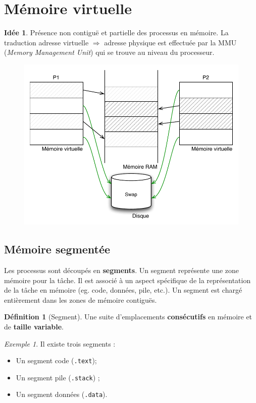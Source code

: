 \documentclass[11pt,english,french]{scrreprt}
\theoremstyle{remark}
\newtheorem*{ex*}{Exemple}
\theoremstyle{definition}
\newtheorem*{def*}{Définition}
\newtheorem*{idee*}{Idée}
\begin{document}
\section{Mémoire virtuelle}
\begin{idee*}
	Présence non contiguë et partielle des processus en mémoire. La traduction adresse virtuelle  $\Rightarrow$ adresse physique est effectuée par la MMU (\emph{Memory Management Unit}) qui se trouve au niveau du processeur.
\end{idee*}

\begin{figure}[h!]
	\center
	\vspace{-20pt}
	\includegraphics[scale=.7]{img/mem-virtuelle}
	\vspace{-30pt}
\end{figure}

\subsection{Mémoire segmentée}
Les processus sont découpés en \textbf{segments}. Un segment représente une zone mémoire pour la tâche. Il est associé à un aspect spécifique de la représentation de la tâche en mémoire (eg. code, données, pile, etc.). Un segment est chargé entièrement dans les zones de mémoire contiguës.

\begin{def*}[Segment]
Une suite d'emplacements \textbf{consécutifs} en mémoire et de \textbf{taille variable}.
\end{def*}

\begin{ex*}
	Il existe trois segments :
	\begin{itemize}
		\item Un segment code (\lstinline!.text!);
		\item Un segment pile (\lstinline!.stack!) ;
		\item Un segment données (\lstinline!.data!).
	\end{itemize}
\end{ex*}
\end{document}
